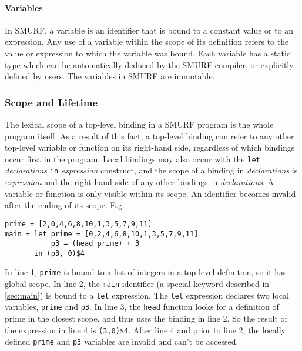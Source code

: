 \paragraph{Variables}
In SMURF, a variable is an identifier that is bound to a constant value
or to an expression. Any use of a variable within the scope of its definition
refers to the value or expression to which the variable was bound.
Each variable has a static type which can be automatically
deduced by the SMURF compiler, or explicitly defined by users. The variables in SMURF are immutable.


\subsubsection{Scope and Lifetime}
The lexical scope of a top-level binding in a SMURF program is the whole program itself.
As a result of this fact, a top-level binding can refer to any other top-level variable or function
on its right-hand side, regardless of which bindings occur first in the program.
Local bindings may also occur
with the \texttt{let} \emph{declarations} \texttt{in} \emph{expression} construct, and the
scope of a binding in \emph{declarations} is \emph{expression} and the right hand side of any other bindings in
\emph{declarations}. A variable or function is only visible within its scope.
An identifier becomes invalid after the ending of its scope. E.g.

\begin{verbatim}
prime = [2,0,4,6,8,10,1,3,5,7,9,11] 
main = let prime = [0,2,4,6,8,10,1,3,5,7,9,11]
           p3 = (head prime) + 3
       in (p3, 0)$4
\end{verbatim}

In line 1, \texttt{prime} is bound to a list of integers in a top-level definition, so it
has global scope.
In line 2, the \texttt{main} identifier (a special keyword described in \ref{sec:main}) 
is bound to a \texttt{let} expression. The \texttt{let} expression declares two local variables,
\texttt{prime} and \texttt{p3}. In line 3, the \texttt{head} function looks for a definition
of prime in the closest scope, and thus uses the binding in line 2. So the result
of the expression in line 4 is \texttt{(3,0)\$4}. After line 4 and prior to line 2, 
the locally defined \texttt{prime} and
\texttt{p3} variables are invalid and can't be accessed.

